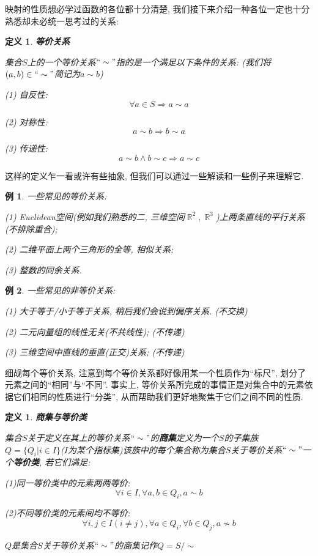 \documentclass[UTF8]{ctexart}
\newcommand{\<}{\langle}
\renewcommand{\>}{\rangle}
\DeclareMathOperator{\R}{\mathbb{R}}
\newtheorem{dfn}[thm]{定义}
\newtheorem{xmp}{例}[subsection]
\begin{document}
            映射的性质想必学过函数的各位都十分清楚, 我们接下来介绍一种各位一定也十分熟悉却未必统一思考过的关系: 

            \begin{dfn}
                \textbf{等价关系}

                集合$S$上的一个等价关系$``\sim"$指的是一个满足以下条件的关系: (我们将$(a,b)\in``\sim"$简记为$a\sim b$)

                (1) 自反性: 
                \[\forall a\in S\Longrightarrow a\sim a\]
                
                (2) 对称性: 
                \[a\sim b\Longrightarrow b\sim a\]

                (3) 传递性: 
                \[a\sim b\wedge b\sim c\Longrightarrow a\sim c\]
            \end{dfn}

            这样的定义乍一看或许有些抽象, 但我们可以通过一些解读和一些例子来理解它. 
            
            \begin{xmp}
                一些常见的等价关系: 
                
                (1) Euclidean空间(例如我们熟悉的二, 三维空间$\R^2,\R^3$)上两条直线的平行关系(不排除重合); 
                
                (2) 二维平面上两个三角形的全等, 相似关系; 

                (3) 整数的同余关系. 
            \end{xmp}
            
            \begin{xmp}
                一些常见的非等价关系: 

                (1) 大于等于/小于等于关系, 稍后我们会说到偏序关系. (不交换)
                
                (2) 二元向量组的线性无关(不共线性); (不传递)

                (3) 三维空间中直线的垂直(正交)关系; (不传递)
            \end{xmp}

            细觇每个等价关系, 注意到每个等价关系都好像用某一个性质作为``标尺'', 划分了元素之间的``相同''与``不同''. 事实上, 等价关系所完成的事情正是对集合中的元素依据它们相同的性质进行``分类'', 从而帮助我们更好地聚焦于它们之间不同的性质. 
            
            \begin{dfn}
                \textbf{商集与等价类}

                集合$S$关于定义在其上的等价关系$``\sim"$的\textbf{商集}定义为一个$S$的子集族$Q=\{Q_i|i\in I\}$($I$为某个指标集)该族中的每个集合称为集合$S$关于等价关系$``\sim"$一个\textbf{等价类}, 若它们满足: 

                (1)同一等价类中的元素两两等价: 
                \[\forall i\in I, \forall a,b\in Q_i, a\sim b\]

                (2)不同等价类的元素间均不等价: 
                \[\forall i,j\in I(i\neq j), \forall a\in Q_i, \forall b\in Q_j, a\not\sim b\]

                $Q$是集合$S$关于等价关系$``\sim"$的商集记作$Q=S/\sim$
            \end{dfn}
\end{document}
